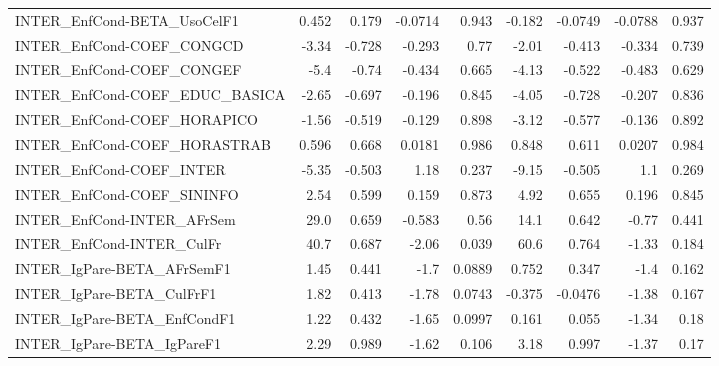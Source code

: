 \begin{tabular}{lrrrrrrrr}
INTER\_EnfCond-BETA\_UsoCelF1           &       0.452 &        0.179 & -0.0714 &    0.943 &     -0.182 &     -0.0749 &      -0.0788 &         0.937 \\
INTER\_EnfCond-COEF\_CONGCD             &       -3.34 &       -0.728 &  -0.293 &     0.77 &      -2.01 &      -0.413 &       -0.334 &         0.739 \\
INTER\_EnfCond-COEF\_CONGEF             &        -5.4 &        -0.74 &  -0.434 &    0.665 &      -4.13 &      -0.522 &       -0.483 &         0.629 \\
INTER\_EnfCond-COEF\_EDUC\_BASICA        &       -2.65 &       -0.697 &  -0.196 &    0.845 &      -4.05 &      -0.728 &       -0.207 &         0.836 \\
INTER\_EnfCond-COEF\_HORAPICO           &       -1.56 &       -0.519 &  -0.129 &    0.898 &      -3.12 &      -0.577 &       -0.136 &         0.892 \\
INTER\_EnfCond-COEF\_HORASTRAB          &       0.596 &        0.668 &  0.0181 &    0.986 &      0.848 &       0.611 &       0.0207 &         0.984 \\
INTER\_EnfCond-COEF\_INTER              &       -5.35 &       -0.503 &    1.18 &    0.237 &      -9.15 &      -0.505 &          1.1 &         0.269 \\
INTER\_EnfCond-COEF\_SININFO            &        2.54 &        0.599 &   0.159 &    0.873 &       4.92 &       0.655 &        0.196 &         0.845 \\
INTER\_EnfCond-INTER\_AFrSem            &        29.0 &        0.659 &  -0.583 &     0.56 &       14.1 &       0.642 &        -0.77 &         0.441 \\
INTER\_EnfCond-INTER\_CulFr             &        40.7 &        0.687 &   -2.06 &    0.039 &       60.6 &       0.764 &        -1.33 &         0.184 \\
INTER\_IgPare-BETA\_AFrSemF1            &        1.45 &        0.441 &    -1.7 &   0.0889 &      0.752 &       0.347 &         -1.4 &         0.162 \\
INTER\_IgPare-BETA\_CulFrF1             &        1.82 &        0.413 &   -1.78 &   0.0743 &     -0.375 &     -0.0476 &        -1.38 &         0.167 \\
INTER\_IgPare-BETA\_EnfCondF1           &        1.22 &        0.432 &   -1.65 &   0.0997 &      0.161 &       0.055 &        -1.34 &          0.18 \\
INTER\_IgPare-BETA\_IgPareF1            &        2.29 &        0.989 &   -1.62 &    0.106 &       3.18 &       0.997 &        -1.37 &          0.17 \\

\end{tabular}
